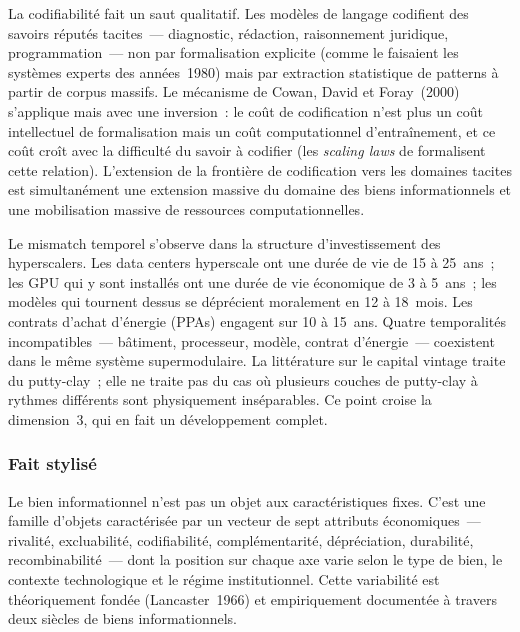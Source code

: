 La codifiabilité fait un saut qualitatif. Les modèles de langage codifient des savoirs réputés tacites~--- diagnostic, rédaction, raisonnement juridique, programmation~--- non par formalisation explicite (comme le faisaient les systèmes experts des années~1980) mais par extraction statistique de patterns à partir de corpus massifs. Le mécanisme de Cowan, David et Foray~(2000) s'applique mais avec une inversion~: le coût de codification n'est plus un coût intellectuel de formalisation mais un coût computationnel d'entraînement, et ce coût croît avec la difficulté du savoir à codifier (les \emph{scaling laws} de \textcite{kaplan_scaling_2020} formalisent cette relation). L'extension de la frontière de codification vers les domaines tacites est simultanément une extension massive du domaine des biens informationnels et une mobilisation massive de ressources computationnelles.

Le mismatch temporel s'observe dans la structure d'investissement des hyperscalers. Les data centers hyperscale ont une durée de vie de 15 à 25~ans~; les GPU qui y sont installés ont une durée de vie économique de 3 à 5~ans~; les modèles qui tournent dessus se déprécient moralement en 12 à 18~mois. Les contrats d'achat d'énergie (PPAs) engagent sur 10 à 15~ans. Quatre temporalités incompatibles~--- bâtiment, processeur, modèle, contrat d'énergie~--- coexistent dans le même système supermodulaire. La littérature sur le capital vintage \parencite{johansen_substitution_1959} traite du putty-clay~; elle ne traite pas du cas où plusieurs couches de putty-clay à rythmes différents sont physiquement inséparables. Ce point croise la dimension~3, qui en fait un développement complet.


\subsubsection{Fait stylisé}

Le bien informationnel n'est pas un objet aux caractéristiques fixes. C'est une famille d'objets caractérisée par un vecteur de sept attributs économiques~--- rivalité, excluabilité, codifiabilité, complémentarité, dépréciation, durabilité, recombinabilité~--- dont la position sur chaque axe varie selon le type de bien, le contexte technologique et le régime institutionnel. Cette variabilité est théoriquement fondée (Lancaster~1966) et empiriquement documentée à travers deux siècles de biens informationnels.

